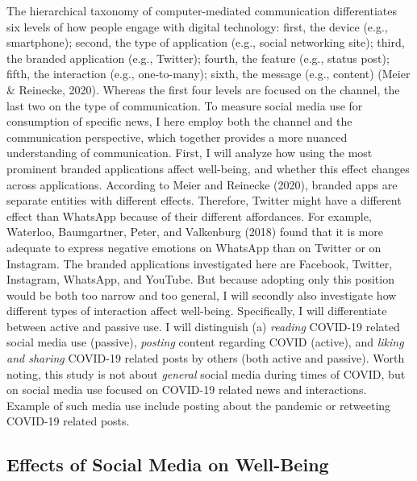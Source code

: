 \documentclass[
  english,
  man,mask,floatsintext]{apa6}
\begin{document}
The hierarchical taxonomy of computer-mediated communication differentiates six levels of how people engage with digital technology:
first, the device (e.g., smartphone); second, the type of application (e.g., social networking site); third, the branded application (e.g., Twitter); fourth, the feature (e.g., status post); fifth, the interaction (e.g., one-to-many); sixth, the message (e.g., content) (Meier \& Reinecke, 2020).
Whereas the first four levels are focused on the channel, the last two on the type of communication.
To measure social media use for consumption of specific news, I here employ both the channel and the communication perspective, which together provides a more nuanced understanding of communication.
First, I will analyze how using the most prominent branded applications affect well-being, and whether this effect changes across applications.
According to Meier and Reinecke (2020), branded apps are separate entities with different effects.
Therefore, Twitter might have a different effect than WhatsApp because of their different affordances.
For example, Waterloo, Baumgartner, Peter, and Valkenburg (2018) found that it is more adequate to express negative emotions on WhatsApp than on Twitter or on Instagram.
The branded applications investigated here are Facebook, Twitter, Instagram, WhatsApp, and YouTube.
But because adopting only this position would be both too narrow and too general, I will secondly also investigate how different types of interaction affect well-being.
Specifically, I will differentiate between active and passive use.
I will distinguish (a) \emph{reading} COVID-19 related social media use (passive), \emph{posting} content regarding COVID (active), and \emph{liking and sharing} COVID-19 related posts by others (both active and passive).
Worth noting, this study is not about \emph{general} social media during times of COVID, but on social media use focused on COVID-19 related news and interactions.
Example of such media use include posting about the pandemic or retweeting COVID-19 related posts.

\hypertarget{effects-of-social-media-on-well-being}{%
\subsection{Effects of Social Media on Well-Being}\label{effects-of-social-media-on-well-being}}
\end{document}
